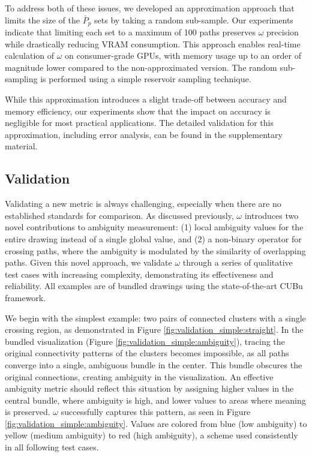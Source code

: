 To address both of these issues, we developed an approximation approach that limits the size of the $\bar{P}_p$ sets by taking a random sub-sample. Our experiments indicate that limiting each set to a maximum of 100 paths preserves $\omega$ precision while drastically reducing VRAM consumption. This approach enables real-time calculation of $\omega$ on consumer-grade GPUs, with memory usage up to an order of magnitude lower compared to the non-approximated version. The random sub-sampling is performed using a simple reservoir sampling technique\cite{vitter:1985}.

While this approximation introduces a slight trade-off between accuracy and memory efficiency, our experiments show that the impact on accuracy is negligible for most practical applications. The detailed validation for this approximation, including error analysis, can be found in the supplementary material.


\subsection{Validation}

Validating a new metric is always challenging, especially when there are no established standards for comparison. As discussed previously, $\omega$ introduces two novel contributions to ambiguity measurement: (1) local ambiguity values for the entire drawing instead of a single global value, and (2) a non-binary operator for crossing paths, where the ambiguity is modulated by the similarity of overlapping paths. Given this novel approach, we validate $\omega$ through a series of qualitative test cases with increasing complexity, demonstrating its effectiveness and reliability. All examples are of bundled drawings using the state-of-the-art CUBu framework\cite{van:2016}.

We begin with the simplest example: two pairs of connected clusters with a single crossing region, as demonstrated in Figure \ref{fig:validation_simple:straight}. In the bundled visualization (Figure \ref{fig:validation_simple:ambiguity}), tracing the original connectivity patterns of the clusters becomes impossible, as all paths converge into a single, ambiguous bundle in the center. This bundle obscures the original connections, creating ambiguity in the visualization. An effective ambiguity metric should reflect this situation by assigning higher values in the central bundle, where ambiguity is high, and lower values to areas where meaning is preserved. $\omega$ successfully captures this pattern, as seen in Figure \ref{fig:validation_simple:ambiguity}. Values are colored from blue (low ambiguity) to yellow (medium ambiguity) to red (high ambiguity), a scheme used consistently in all following test cases.

